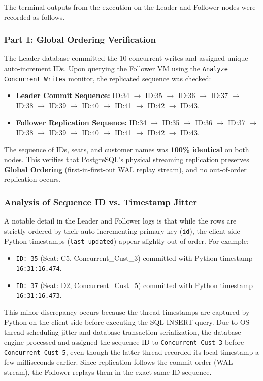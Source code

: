 \documentclass[12pt]{article}
\begin{document}
The terminal outputs from the execution on the Leader and Follower nodes were recorded as follows.

\subsubsection{Part 1: Global Ordering Verification}
The Leader database committed the 10 concurrent writes and assigned unique auto-increment IDs. Upon querying the Follower VM using the \texttt{Analyze Concurrent Writes} monitor, the replicated sequence was checked:
\begin{itemize}
    \item \textbf{Leader Commit Sequence:} ID:34 $\rightarrow$ ID:35 $\rightarrow$ ID:36 $\rightarrow$ ID:37 $\rightarrow$ ID:38 $\rightarrow$ ID:39 $\rightarrow$ ID:40 $\rightarrow$ ID:41 $\rightarrow$ ID:42 $\rightarrow$ ID:43.
    \item \textbf{Follower Replication Sequence:} ID:34 $\rightarrow$ ID:35 $\rightarrow$ ID:36 $\rightarrow$ ID:37 $\rightarrow$ ID:38 $\rightarrow$ ID:39 $\rightarrow$ ID:40 $\rightarrow$ ID:41 $\rightarrow$ ID:42 $\rightarrow$ ID:43.
\end{itemize}
The sequence of IDs, seats, and customer names was \textbf{100\% identical} on both nodes. This verifies that PostgreSQL's physical streaming replication preserves \textbf{Global Ordering} (first-in-first-out WAL replay stream), and no out-of-order replication occurs.

\subsubsection{Analysis of Sequence ID vs. Timestamp Jitter}
A notable detail in the Leader and Follower logs is that while the rows are strictly ordered by their auto-incrementing primary key (\texttt{id}), the client-side Python timestamps (\texttt{last\_updated}) appear slightly out of order. For example:
\begin{itemize}
    \item \texttt{ID: 35} (Seat: C5, Concurrent\_Cust\_3) committed with Python timestamp \texttt{16:31:16.474}.
    \item \texttt{ID: 37} (Seat: D2, Concurrent\_Cust\_5) committed with Python timestamp \texttt{16:31:16.473}.
\end{itemize}
This minor discrepancy occurs because the thread timestamps are captured by Python on the client-side before executing the SQL INSERT query. Due to OS thread scheduling jitter and database transaction serialization, the database engine processed and assigned the sequence ID to \texttt{Concurrent\_Cust\_3} before \texttt{Concurrent\_Cust\_5}, even though the latter thread recorded its local timestamp a few milliseconds earlier. Since replication follows the commit order (WAL stream), the Follower replays them in the exact same ID sequence.
\end{document}
